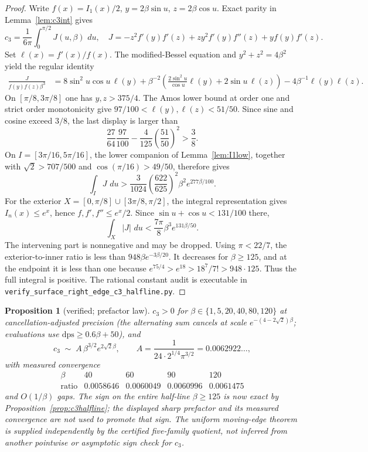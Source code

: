 \documentclass[11pt]{article}
\newtheorem{proposition}[theorem]{Proposition}
\theoremstyle{remark}
\newcommand{\dd}{\,d}
\begin{document}
\begin{proof}
Write $f(x)=I_1(x)/2$, $y=2\beta\sin u$, $z=2\beta\cos u$.  Exact
parity in Lemma~\ref{lem:c3int} gives
\[
 c_3=\frac1{6\pi}\int_0^{\pi/2}J(u,\beta)\,\dd u,
 \quad
 J=-z^2f'(y)f'(z)+zy^2f'(y)f''(z)+yf(y)f'(z).
\]
Set $\ell(x)=f'(x)/f(x)$.  The modified-Bessel equation and
$y^2+z^2=4\beta^2$ yield the regular identity
\begin{align*}
 \frac{J}{f(y)f(z)\beta^3}
 &=8\sin^2u\cos u\,\ell(y)
   +\beta^{-2}\left(\frac{2\sin^2u}{\cos u}\ell(y)
                     +2\sin u\,\ell(z)\right)
   -4\beta^{-1}\ell(y)\ell(z).
\end{align*}
On $[\pi/8,3\pi/8]$ one has $y,z>375/4$.  The Amos lower bound at
order one and strict order monotonicity give
$97/100<\ell(y),\ell(z)<51/50$.  Since sine and cosine exceed $3/8$,
the last display is larger than
\[
 \frac{27}{64}\frac{97}{100}
 -\frac4{125}\left(\frac{51}{50}\right)^2>\frac38.
\]
On $I=[3\pi/16,5\pi/16]$, the lower companion of
Lemma~\ref{lem:I1low}, together with
$\sqrt2>707/500$ and $\cos(\pi/16)>49/50$, therefore gives
\[
 \int_IJ\,\dd u>
 \frac3{1024}\left(\frac{622}{625}\right)^2
 \beta^2e^{277\beta/100}.
\]
For the exterior
$X=[0,\pi/8]\cup[3\pi/8,\pi/2]$, the integral representation gives
$I_n(x)\le e^x$, hence
$f,f',f''\le e^x/2$.  Since
$\sin u+\cos u<131/100$ there,
\[
 \int_X|J|\,\dd u<\frac{7\pi}{8}\beta^3e^{131\beta/50}.
\]
The intervening part is nonnegative and may be dropped.  Using
$\pi<22/7$, the exterior-to-inner ratio is less than
$948\beta e^{-3\beta/20}$.  It decreases for $\beta\ge125$, and at
the endpoint it is less than one because
$e^{75/4}>e^{18}>18^7/7!>948\cdot125$.  Thus the full integral is
positive.  The rational constant audit is executable in
\texttt{verify\_surface\_right\_edge\_c3\_halfline.py}.
\end{proof}

\begin{proposition}[verified; prefactor law]\label{prop:prefactor}
$c_3>0$ for $\beta\in\{1,5,20,40,80,120\}$ at cancellation-adjusted
precision \textup{(the alternating sum cancels at scale
$e^{-(4-2\sqrt2)\beta}$; evaluations use $\mathrm{dps}\ge0.6\beta+50$)},
and
\[
c_3\;\sim\;A\,\beta^{3/2}e^{2\sqrt2\beta},\qquad
A=\frac{1}{24\cdot2^{1/4}\pi^{3/2}}=0.0062922\ldots,
\]
with measured convergence
\[
\begin{array}{c|cccc}
\beta&40&60&90&120\\ \hline
\text{ratio}&0.0058646&0.0060049&0.0060996&0.0061475
\end{array}
\]
and $O(1/\beta)$ gaps.  The sign on the entire
half-line $\beta\ge125$ is now exact by
Proposition~\ref{prop:c3halfline}; the displayed sharp prefactor and its
measured convergence are not used to promote that sign.  The uniform
moving-edge theorem is supplied independently by the certified five-family
quotient, not inferred from another pointwise or asymptotic sign check for
$c_3$.
\end{proposition}
\end{document}
